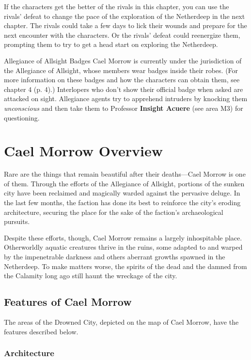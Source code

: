 \documentclass[a4paper, 11pt, bg=full, twocolumn, nooutline]{dndbook}
\begin{document}
If the characters get the better of the rivals in this chapter, you can use the rivals' defeat to change the pace of the exploration of the Netherdeep in the next chapter. The rivals could take a few days to lick their wounds and prepare for the next encounter with the characters. Or the rivals' defeat could reenergize them, prompting them to try to get a head start on exploring the Netherdeep.

\begin{DndSidebar}{Allegiance of Allsight Badges}
Cael Morrow is currently under the jurisdiction of the Allegiance of Allsight, whose members wear badges inside their robes. (For more information on these badges and how the characters can obtain them, see chapter 4 (p. 4).) Interlopers who don't show their official badge when asked are attacked on sight. Allegiance agents try to apprehend intruders by knocking them \textit{unconscious} and then take them to Professor \textbf{Insight Acuere} (see area M3) for questioning.
\end{DndSidebar}
\section{Cael Morrow Overview}

Rare are the things that remain beautiful after their deaths---Cael Morrow is one of them. Through the efforts of the Allegiance of Allsight, portions of the sunken city have been reclaimed and magically warded against the pervasive deluge. In the last few months, the faction has done its best to reinforce the city's eroding architecture, securing the place for the sake of the faction's archaeological pursuits.

Despite these efforts, though, Cael Morrow remains a largely inhospitable place. Otherworldly aquatic creatures thrive in the ruins, some adapted to and warped by the impenetrable darkness and others aberrant growths spawned in the Netherdeep. To make matters worse, the spirits of the dead and the damned from the Calamity long ago still haunt the wreckage of the city.

\subsection{Features of Cael Morrow}

The areas of the Drowned City, depicted on the map of Cael Morrow, have the features described below.

\subsubsection{Architecture}
\end{document}
